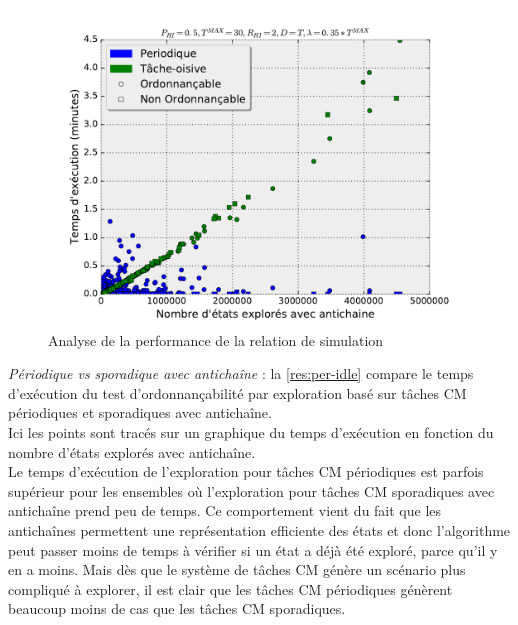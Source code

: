 \documentclass[12pt,a4paper,oneside]{book}
\theoremstyle{break}
\theoremstyle{breakplain}
\begin{document}
\begin{figure}[h]
\includegraphics[width=\textwidth]{./results/timePerIdle.pdf}
\caption{Analyse de la performance de la relation de simulation}
\label{res:per-idle}
\end{figure}

\textit{Périodique vs sporadique avec antichaîne} : la \autoref{res:per-idle} compare le temps d'exécution du test d'ordonnançabilité par exploration basé sur tâches CM périodiques et sporadiques avec antichaîne.\\
Ici les points sont tracés sur un graphique du temps d'exécution en fonction du nombre d'états explorés avec antichaîne.\\
Le temps d'exécution de l'exploration pour tâches CM périodiques est parfois supérieur pour les ensembles où l'exploration pour tâches CM sporadiques avec antichaîne prend peu de temps. Ce comportement vient du fait que les antichaînes permettent une représentation efficiente des états et donc l'algorithme peut passer moins de temps à vérifier si un état a déjà été exploré, parce qu'il y en a moins. Mais dès que le système de tâches CM génère un scénario plus compliqué à explorer, il est clair que les tâches CM périodiques génèrent beaucoup moins de cas que les tâches CM sporadiques.\\
\end{document}
